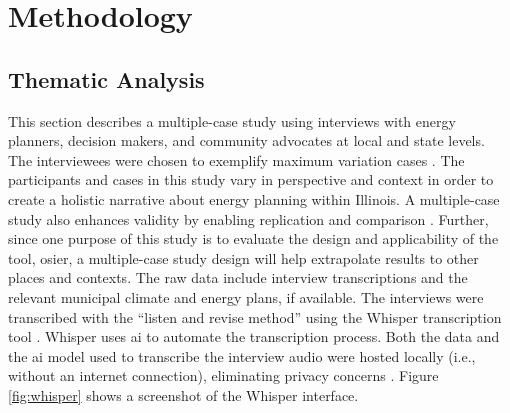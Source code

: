 
\section{Methodology}
\label{section:interview-methods}

\subsection{Thematic Analysis}
This section describes a multiple-case study using interviews with energy
planners, decision makers, and community advocates at local and state levels.
The interviewees were chosen to exemplify maximum variation cases
\cite{flyvbjerg_five_2006}. The participants and cases in this study vary in
perspective and context in order to create a holistic narrative about energy
planning within Illinois. A multiple-case study also enhances validity by
enabling replication and comparison \cite{johannsen_designing_2021,
yin_case_2018}. Further, since one purpose of this study is to evaluate the
design and applicability of the tool, \ac{osier}, a multiple-case study design
will help extrapolate results to other places and contexts. The raw data include
interview transcriptions and the relevant municipal climate and energy plans, if
available. The interviews were transcribed with the ``listen and revise method''
using the Whisper transcription tool \cite{battaglia_listen_2024}. Whisper uses
\ac{ai} to automate the transcription process. Both the data and the \ac{ai}
model used to transcribe the interview audio were hosted locally (i.e., without
an internet connection), eliminating privacy concerns
\cite{battaglia_listen_2024}. Figure \ref{fig:whisper} shows a screenshot of the
Whisper interface. 

